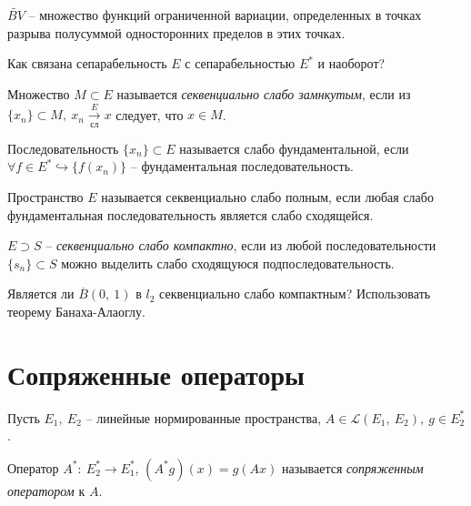 $\displaystyle \widetilde{BV}$ -- множество функций ограниченной вариации, определенных в точках разрыва полусуммой односторонних пределов в этих точках.
\begin{exercise}
Как связана сепарабельность $\displaystyle E$ с сепарабельностью $\displaystyle E^{*}$ и наоборот?
\end{exercise}
\begin{definition}
Множество $\displaystyle M\subset E$ называется \textit{секвенциально слабо замнкутым}, если из $\displaystyle \{x_{n}\} \subset M,\ x_{n}\xrightarrow[\text{сл}]{E} x$ следует, что $\displaystyle x\in M$. 
\end{definition}
\begin{definition}
Последовательность $\displaystyle \{x_{n}\} \subset E$ называется слабо фундаментальной, если $\displaystyle \forall f\in E^{*} \hookrightarrow \{f( x_{n})\}$ -- фундаментальная последовательность.
\end{definition}
\begin{definition}
Пространство $\displaystyle E$ называется секвенциально слабо полным, если любая слабо фундаментальная последовательность является слабо сходящейся.
\end{definition}
\begin{definition}
$\displaystyle E\supset S$ -- \textit{секвенциально слабо компактно}, если из любой последовательности $\displaystyle \{s_{n}\} \subset S$ можно выделить слабо сходящуюся подпоследовательность.
\end{definition}
\begin{exercise}
Является ли $\displaystyle \overline{B}( 0,\ 1)$ в $\displaystyle l_{2}$ секвенциально слабо компактным? Использовать теорему Банаха-Алаоглу.
\end{exercise}
\section{Сопряженные операторы}

Пусть $\displaystyle E_{1} ,\ E_{2}$ -- линейные нормированные пространства, $\displaystyle A\in \mathcal{L}( E_{1} ,\ E_{2}) ,\ g\in E_{2}^{*}$.
\begin{definition}
Оператор $\displaystyle A^{*} :\ E_{2}^{*}\rightarrow E_{1}^{*}$, $\displaystyle \left( A^{*} g\right)( x) =g( Ax)$ называется \textit{сопряженным оператором} к $\displaystyle A$.
\end{definition}